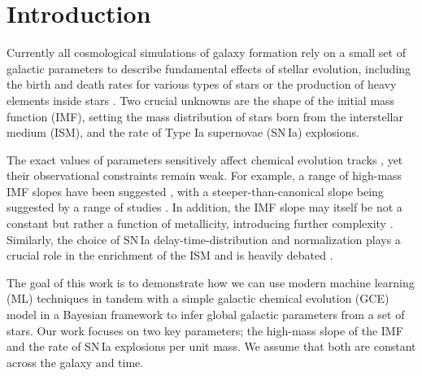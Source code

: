 \documentclass{aa}
\begin{document}
\maketitle
\section{Introduction}

Currently all cosmological simulations of galaxy formation \citep[e.g.][]{Sawala2016,Hopkins2018,Pillepich2018,Buck2020,Buck2020c,Font2020,Agertz2021} rely on a small set of galactic parameters to describe fundamental effects of stellar evolution, including the birth and death rates for various types of stars or the production of heavy elements inside stars \citep[e.g.][]{Buck2021}. Two crucial unknowns are the shape of the initial mass function (IMF), setting the mass distribution of stars born from the interstellar medium (ISM), and the rate of Type Ia supernovae (SN\,Ia) explosions.

The exact values of parameters sensitively affect chemical evolution tracks \citep{2005A&A...430..491R,2015MNRAS.449.1327V,2015MNRAS.451.3693M}, yet their observational constraints remain weak.
%
For example, a range of high-mass IMF slopes have been suggested \citep[Tab.\,7]{2016ApJ...824...82C}, with a steeper-than-canonical slope being suggested by a range of studies \citep[e.g.][]{2015ApJ...806..198W,Rybizki2015,Chabrier2014}. In addition, the IMF slope may itself be not a constant but rather a function of metallicity, introducing further complexity \citep[e.g.][]{2019MNRAS.482..118G,Martin2019}. Similarly, the choice of SN\,Ia delay-time-distribution and normalization plays a crucial role in the enrichment of the ISM \citep[e.g.][]{Buck2021} and is heavily debated \citep{2010ApJ...722.1879M,2012MNRAS.426.3282M,2015ApJ...810..137J}. 

The goal of this work is to demonstrate how we can use modern machine learning (ML) techniques in tandem with a simple galactic chemical evolution (GCE) model in a Bayesian framework to infer global galactic parameters from a set of stars. Our work focuses on two key parameters; the high-mass slope of the \citet[Tab.\,1]{2003PASP..115..763C} IMF and the rate of SN\,Ia explosions per unit mass. We assume that both are constant across the galaxy and time.
\end{document}

